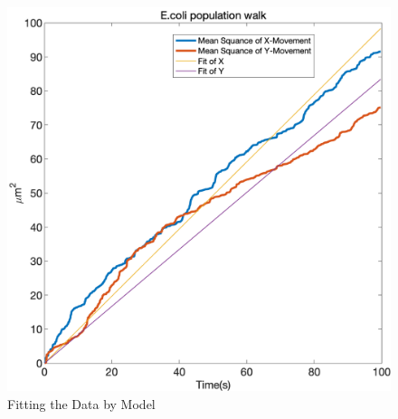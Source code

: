 \begin{figure}[H]
\centering
\includegraphics[width=1\linewidth]{Figures/P3_fig3.png}
\caption{Fitting the Data by Model}
\label{P3_fig3}
\end{figure}








